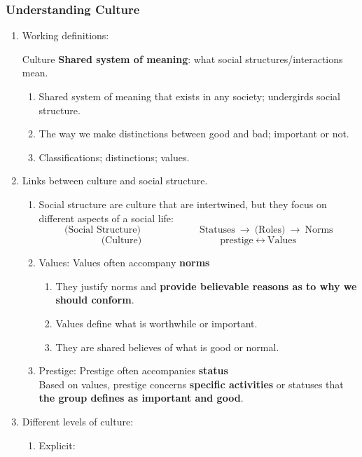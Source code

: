 \documentclass[12pt,a4paper]{article}
\begin{document}
\subsubsection{Understanding Culture}
\begin{enumerate}
	\item Working definitions: 
	\begin{df}{Culture}
		\textbf{Shared system of meaning}: what social structures/interactions mean. 
	\end{df}
	\begin{enumerate}
		\item Shared system of meaning that exists in any society; undergirds social structure. 
		\item The way we make distinctions between good and bad; important or not. 
		\item Classifications; distinctions; values. 
	\end{enumerate}
	\item Links between culture and social structure. 
	\begin{enumerate}
		\item Social structure are culture that are intertwined, but they focus on different aspects of a social life: 
		$$\text{(Social Structure)}\qquad\qquad\qquad\text{Statuses}\ \longrightarrow\ \text{(Roles)}\ \longrightarrow\ \text{Norms}$$
		$$\text{(Culture)}\qquad\qquad\qquad\qquad\text{prestige}\ \longleftrightarrow\ \text{Values} $$
		\item Values: Values often accompany \textbf{norms}
		\begin{enumerate}
			\item They justify norms and \textbf{provide believable reasons as to why we should conform}.
			\item Values define what is worthwhile or important. 
			\item They are shared believes of what is good or normal. 
		\end{enumerate}
		\item Prestige: Prestige often accompanies \textbf{status}\\
		Based on values, prestige concerns \textbf{specific activities} or statuses that \textbf{the group defines as important and good}. 
	\end{enumerate}
	\item Different levels of culture: 
	\begin{enumerate}
		\item Explicit: 
		\begin{enumerate}

\end{enumerate}
\end{enumerate}
\end{enumerate}
\end{document}
